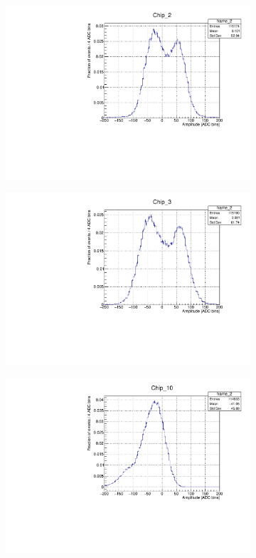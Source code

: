 \documentclass[12pt]{article}
\begin{document}
\begin{figure}[h!]
\begin{subfigure}[t]{0.45\textwidth}
		\includegraphics[width=\textwidth]{Chip_2_amp_hist}
	\end{subfigure}
	\begin{subfigure}[t]{0.45\textwidth}
		\centering
		\includegraphics[width=\textwidth]{Chip_3_amp_hist}
	\end{subfigure}
	\begin{subfigure}[t]{0.45\textwidth}
		\centering
		\includegraphics[width=\textwidth]{Chip_10_amp_hist}

\end{subfigure}
\end{figure}
\end{document}
